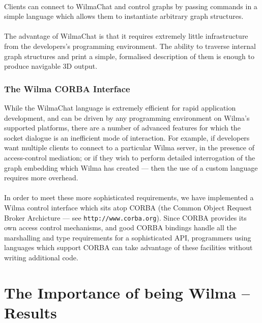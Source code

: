 \documentclass[runningheads]{cl2emult}
\newcommand{\url}[1]{{\small{\tt #1}}}
\begin{document}
\paragraph{}

Clients can connect to WilmaChat and control graphs by passing commands
in a simple language which allows them to instantiate arbitrary graph
structures.

\paragraph{}

The advantage of WilmaChat is that it requires extremely little infrastructure
from the developers's programming environment.  The ability to traverse
internal graph structures and print a simple, formalised description of them
is enough to produce navigable 3D output.

\subsubsection{The Wilma CORBA Interface}

While the WilmaChat language is extremely efficient for rapid application
development, and can be driven by any programming environment on Wilma's
supported platforms, there are a number of advanced features for which the
socket dialogue is an inefficient mode of interaction.  For example, if
developers want multiple clients to connect to a particular Wilma server, in
the presence of access-control mediation; or if they wish to perform detailed
interrogation of the graph embedding which Wilma has created --- then the use
of a custom language requires more overhead.

\paragraph{}

In order to meet these more sophisticated requirements, we have implemented a
Wilma control interface which sits atop CORBA (the Common Object Request
Broker Archicture --- see \url{http://www.corba.org}).  Since CORBA provides
its own access control mechanisms, and good CORBA bindings handle all the
marshalling and type requirements for a sophisticated API, programmers using
languages which support CORBA can take advantage of these facilities without
writing additional code.

\section{The Importance of being Wilma -- Results}
\label{sec:results}
\end{document}
